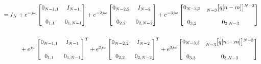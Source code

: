 \documentclass{article}
\begin{document}
\begin{align*}
    &= I_{N} + e^{-j\omega}\begin{bmatrix}
                                0_{N - 1, 1} & I_{N - 1} \\ \\
                                0_{    1, 1} & 0_{1, N - 1}
                             \end{bmatrix} +
              e^{-2j\omega}\begin{bmatrix}
                                0_{N - 2, 2} & I_{N - 2} \\ \\
                                0_{    2, 2} & 0_{2, N - 2}
                             \end{bmatrix} +
              e^{-3j\omega}\begin{bmatrix}
                                0_{N - 3, 2} & \prescript{}{N - 3}{\begin{bmatrix} q[n - m] \end{bmatrix}}^{N - 3} \\ \\
                                0_{    3, 2} & 0_{3, N - 3}
                             \end{bmatrix}  \\ \\
    &\quad \quad \quad + e^{j\omega}\begin{bmatrix}
                                           0_{N - 1, 1} & I_{N - 1} \\ \\
                                           0_{    1, 1} & 0_{1, N - 1}
                                      \end{bmatrix}^{T} + 
                        e^{2j\omega}\begin{bmatrix}
                                           0_{N - 2, 2} & I_{N - 2} \\ \\
                                           0_{    2, 2} & 0_{2, N - 2}
                                      \end{bmatrix}^{T} + 
                        e^{3j\omega}\begin{bmatrix}
                                           0_{N - 3, 3} & \prescript{}{N - 3}{\begin{bmatrix} q[n - m] \end{bmatrix}}^{N - 3} \\ \\
                                           0_{    3, 3} & 0_{3, N - 3}

\end{bmatrix}
\end{align*}
\end{document}
